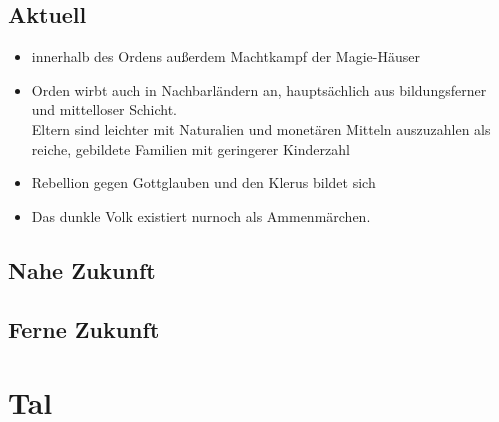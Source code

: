 \section{Aktuell}
\begin{itemize}
	\item innerhalb des Ordens außerdem Machtkampf der Magie-Häuser
	\item Orden wirbt auch in Nachbarländern an, hauptsächlich aus bildungsferner und mittelloser Schicht.\\
	Eltern sind leichter mit Naturalien und monetären Mitteln auszuzahlen als reiche, gebildete Familien mit geringerer Kinderzahl
	\item Rebellion gegen Gottglauben und den Klerus bildet sich
	\item Das dunkle Volk existiert nurnoch als Ammenmärchen.
\end{itemize}

\section{Nahe Zukunft}

\section{Ferne Zukunft}

\chapter{Tal}